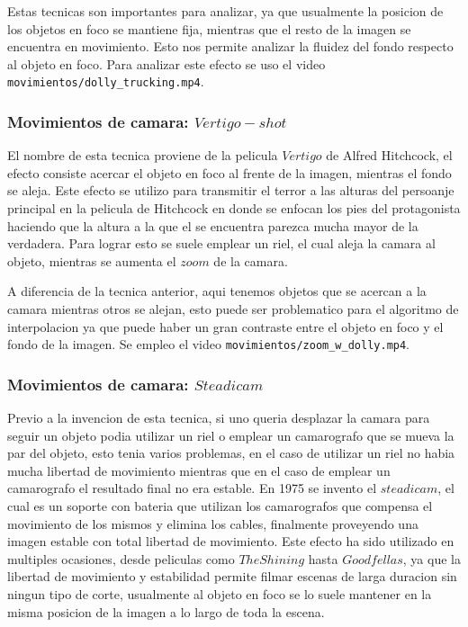 Estas tecnicas son importantes para analizar, ya que usualmente la posicion de los objetos en foco se mantiene fija, mientras que el resto de la imagen se encuentra en movimiento. Esto nos permite analizar la fluidez del fondo respecto al objeto en foco. Para analizar este efecto se uso el video \texttt{movimientos/dolly_trucking.mp4}.

\subsubsection{Movimientos de camara: $Vertigo-shot$}

El nombre de esta tecnica proviene de la pelicula $Vertigo$ de Alfred Hitchcock, el efecto consiste acercar el objeto en foco al frente de la imagen, mientras el fondo se aleja. Este efecto se utilizo para transmitir el terror a las alturas del persoanje principal en la pelicula de Hitchcock en donde se enfocan los pies del protagonista haciendo que la altura a la que el se encuentra parezca mucha mayor de la verdadera. Para lograr esto se suele emplear un riel, el cual aleja la camara al objeto, mientras se aumenta el $zoom$ de la camara.

A diferencia de la tecnica anterior, aqui tenemos objetos que se acercan a la camara mientras otros se alejan, esto puede ser problematico para el algoritmo de interpolacion ya que puede haber un gran contraste entre el objeto en foco y el fondo de la imagen. Se empleo el video \texttt{movimientos/zoom_w_dolly.mp4}.

\subsubsection{Movimientos de camara: $Steadicam$}

Previo a la invencion de esta tecnica, si uno queria desplazar la camara para seguir un objeto podia utilizar un riel o emplear un camarografo que se mueva la par del objeto, esto tenia varios problemas, en el caso de utilizar un riel no habia mucha libertad de movimiento mientras que en el caso de emplear un camarografo el resultado final no era estable. En 1975 se invento el $steadicam$, el cual es un soporte con bateria que utilizan los camarografos que compensa el movimiento de los mismos y elimina los cables, finalmente proveyendo una imagen estable con total libertad de movimiento. Este efecto ha sido utilizado en multiples ocasiones, desde peliculas como $The Shining$ hasta $Goodfellas$, ya que la libertad de movimiento y estabilidad permite filmar escenas de larga duracion sin ningun tipo de corte, usualmente al objeto en foco se lo suele mantener en la misma posicion de la imagen a lo largo de toda la escena.

